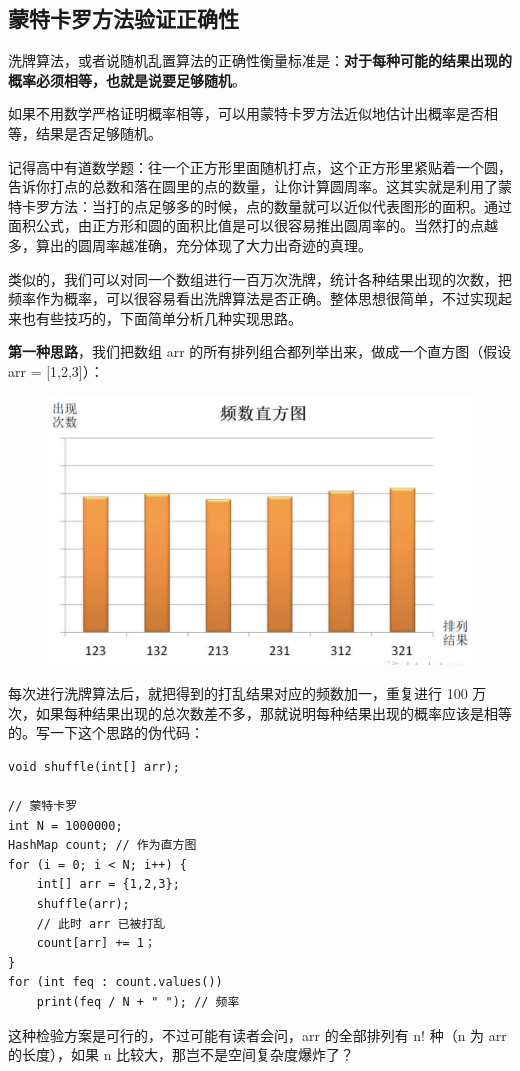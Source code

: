 \documentclass[12pt]{article}
\begin{document}
\subsection{蒙特卡罗方法验证正确性}
洗牌算法，或者说随机乱置算法的正确性衡量标准是：\textbf{对于每种可能的结果出现的概率必须相等，也就是说要足够随机}。

如果不用数学严格证明概率相等，可以用蒙特卡罗方法近似地估计出概率是否相等，结果是否足够随机。

记得高中有道数学题：往一个正方形里面随机打点，这个正方形里紧贴着一个圆，告诉你打点的总数和落在圆里的点的数量，让你计算圆周率。这其实就是利用了蒙特卡罗方法：当打的点足够多的时候，点的数量就可以近似代表图形的面积。通过面积公式，由正方形和圆的面积比值是可以很容易推出圆周率的。当然打的点越多，算出的圆周率越准确，充分体现了大力出奇迹的真理。

类似的，我们可以对同一个数组进行一百万次洗牌，统计各种结果出现的次数，把频率作为概率，可以很容易看出洗牌算法是否正确。整体思想很简单，不过实现起来也有些技巧的，下面简单分析几种实现思路。

\textbf{第一种思路}，我们把数组 arr 的所有排列组合都列举出来，做成一个直方图（假设 arr = [1,2,3]）：
\begin{figure}[H]
    \centering
    \includegraphics[width=.6\textwidth]{fig/shuffle_algorithm_4.png}
\end{figure}

每次进行洗牌算法后，就把得到的打乱结果对应的频数加一，重复进行 100 万次，如果每种结果出现的总次数差不多，那就说明每种结果出现的概率应该是相等的。写一下这个思路的伪代码：
\begin{lstlisting}
void shuffle(int[] arr);

// 蒙特卡罗
int N = 1000000;
HashMap count; // 作为直方图
for (i = 0; i < N; i++) {
    int[] arr = {1,2,3};
    shuffle(arr);
    // 此时 arr 已被打乱
    count[arr] += 1；
}
for (int feq : count.values()) 
    print(feq / N + " "); // 频率
\end{lstlisting}
这种检验方案是可行的，不过可能有读者会问，arr 的全部排列有 n! 种（n 为 arr 的长度），如果 n 比较大，那岂不是空间复杂度爆炸了？
\end{document}
